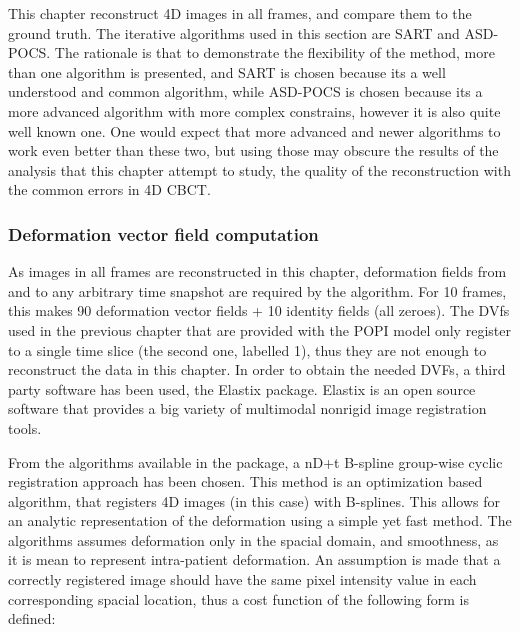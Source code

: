 This chapter reconstruct 4D images in all frames, and compare them to the ground truth. The iterative algorithms used in this section are SART and ASD-POCS. The rationale is that to demonstrate the flexibility of the method, more than one algorithm is presented, and SART is chosen because its a well understood and common algorithm, while ASD-POCS is chosen because its a more advanced algorithm with more complex constrains, however it is also quite well known one. One would expect that more advanced and newer algorithms to work even better than these two, but using those may obscure the results of the analysis that this chapter attempt to study, the quality of the reconstruction with the common errors in 4D CBCT.

\subsubsection{Deformation vector field computation}

As images in all frames are reconstructed in this chapter, deformation fields from and to any arbitrary time snapshot are required by the algorithm. For 10 frames, this makes 90 deformation vector fields + 10 identity fields (all zeroes). The DVfs used in the previous chapter that are provided with the POPI model only register to a single time slice (the second one, labelled 1), thus they are not enough to reconstruct the data in this chapter. In order to obtain the needed DVFs, a third party software has been used, the Elastix\cite{elastix} package. Elastix is an open source software that provides a big variety of multimodal nonrigid image registration tools. 

From the algorithms available in the package, a nD+t B-spline group-wise cyclic registration\cite{metz2011nonrigid} approach has been chosen. This method is an optimization based algorithm, that registers 4D images (in this case) with B-splines. This allows for an analytic representation of the deformation using a simple yet fast method. The algorithms assumes deformation only in the spacial domain, and smoothness, as it is mean to represent intra-patient deformation. An assumption is made that a correctly registered image should have the same pixel intensity value in each corresponding spacial location, thus a cost function of the following form is defined:

